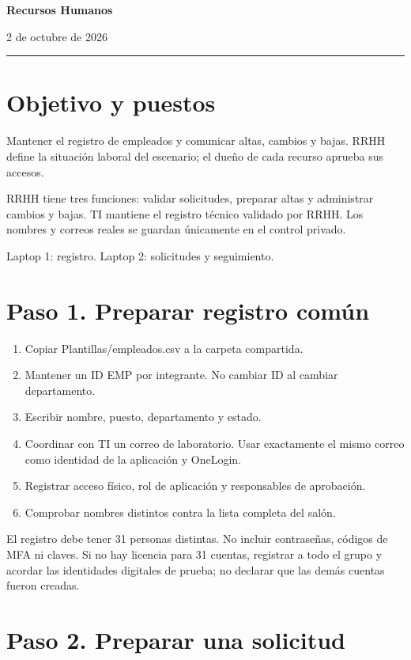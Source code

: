 \documentclass[12pt,a4paper]{article}
\begin{document}
{\LARGE\bfseries Recursos Humanos\par}\vspace{6pt}
2 de octubre de 2026\par\hrule\vspace{10pt}
\section*{Objetivo y puestos}
Mantener el registro de empleados y comunicar altas, cambios y bajas. RRHH define la situación laboral del escenario; el dueño de cada recurso aprueba sus accesos.\par
RRHH tiene tres funciones: validar solicitudes, preparar altas y administrar cambios y bajas. TI mantiene el registro técnico validado por RRHH. Los nombres y correos reales se guardan únicamente en el control privado.\par
Laptop 1: registro. Laptop 2: solicitudes y seguimiento.\par
{}\section*{Paso 1. Preparar registro común}
\begin{enumerate}
\item Copiar \textnormal{Plantillas/\allowbreak{}empleados.csv} a la carpeta compartida.
\item Mantener un ID EMP por integrante. No cambiar ID al cambiar departamento.
\item Escribir nombre, puesto, departamento y estado.
\item Coordinar con TI un correo de laboratorio. Usar exactamente el mismo correo como identidad de la aplicación y OneLogin.
\item Registrar acceso físico, rol de aplicación y responsables de aprobación.
\item Comprobar nombres distintos contra la lista completa del salón.
\end{enumerate}
El registro debe tener 31 personas distintas. No incluir contraseñas, códigos de MFA ni claves. Si no hay licencia para 31 cuentas, registrar a todo el grupo y acordar las identidades digitales de prueba; no declarar que las demás cuentas fueron creadas.\par
{}\section*{Paso 2. Preparar una solicitud}
\end{document}
